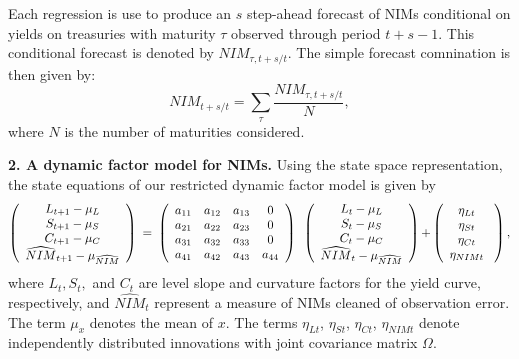\documentclass[11pt]{article}
\begin{document}
Each regression is use to produce an $s$ step-ahead forecast of NIMs conditional on yields on treasuries with maturity $\tau $ observed through period $t+s-1.$ This conditional forecast is denoted by $NIM_{\tau ,t+s/t}.$ The simple forecast comnination is then given by:
\[
NIM_{t+s/t}=\sum_{\tau }\frac{NIM_{\tau ,t+s/t}}{N},
\]
where $N$ is the number of maturities considered.

\noindent \textbf{2. A dynamic factor model for NIMs.} Using the state space representation, the state equations of our restricted dynamic factor model is given by
\[
\left(
\begin{array}{c}
{L_{t+1}-\mu _{L}} \\
{S_{t+1}-\mu _{S}} \\
{C_{t+1}-\mu _{C}} \\
\widehat{NIM}_{t+1}-\mu _{\widehat{NIM}}%
\end{array}%
\right) {\normalsize \ =\ }\left(
\begin{array}{cccc}
a_{11} & a_{12} & a_{13} & 0 \\
a_{21} & a_{22} & a_{23} & 0 \\
a_{31} & a_{32} & a_{33} & 0 \\
a_{41} & a_{42} & a_{43} & a_{44}%
\end{array}%
\right) {\normalsize \ }\left(
\begin{array}{c}
{L_{t}-\mu _{L}} \\
{S_{t}-\mu _{S}} \\
{C_{t}-\mu _{C}} \\
\widehat{NIM}_{t}-\mu _{\widehat{NIM}}%
\end{array}%
\right) {\normalsize +}\left(
\begin{array}{c}
{\eta _{Lt}} \\
{\eta _{St}} \\
{\eta _{Ct}} \\
{\eta _{NIMt}}%
\end{array}%
{\normalsize \ }\right) ,
\]
where $L_{t},S_{t},$ and $C_{t}$ are level slope and curvature factors for the yield curve, respectively, and $\widehat{NIM}_{t}$ represent a measure of NIMs cleaned of observation error. The term $\mu _{x}$ denotes the mean of $x$. The terms ${\eta _{Lt}}$, ${\eta _{St}}$, ${\eta _{Ct}}$, ${\eta_{NIMt}}$ denote independently distributed innovations with joint covariance matrix $\Omega $.
\end{document}
